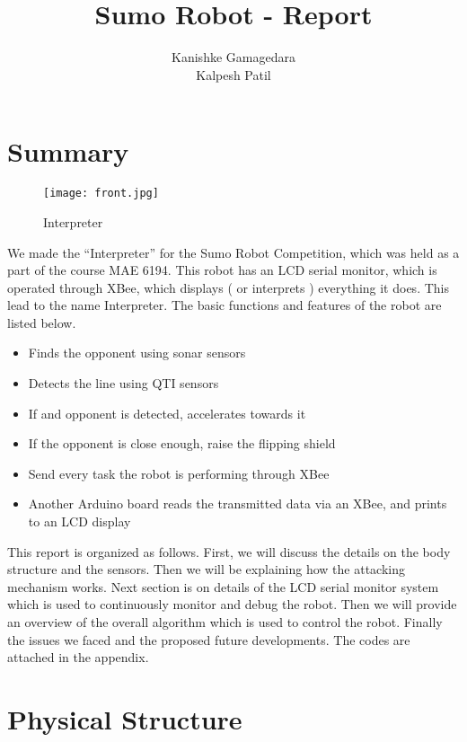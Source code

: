 \documentclass[11pt, letterpaper, oneside]{article}
\title{Sumo Robot - Report}
\author{Kanishke Gamagedara \\ Kalpesh Patil}
\begin{document}

\newpage



\tableofcontents


\newpage
\section{Summary}

\begin{figure}[bth]
	\begin{center}
		\texttt{[image: front.jpg]}
		\caption{Interpreter}
		\label{fig:front}
	\end{center}
\end{figure}

We made the ``Interpreter'' for the Sumo Robot Competition, which was held as a part of the course MAE 6194. This robot has an LCD serial monitor, which is operated through XBee, which displays ( or interprets ) everything it does. This lead to the name Interpreter.  The basic functions and features of the robot are listed below.
\begin{itemize}
	\item Finds the opponent using sonar sensors
	\item Detects the line using QTI sensors
	\item If and opponent is detected, accelerates towards it
	\item If the opponent is close enough, raise the flipping shield
	\item Send every task the robot is performing through XBee
	\item Another Arduino board reads the transmitted data via an XBee, and prints to an LCD display
\end{itemize}

This report is organized as follows. First, we will discuss the details on the body structure and the sensors. Then we will be explaining how the attacking mechanism works. Next section is on details of the LCD serial monitor system which is used to continuously monitor and debug the robot. Then we will provide an overview of the overall algorithm which is used to control the robot. Finally the issues we faced and the proposed future developments. The codes are attached in the appendix.


\newpage
\section{Physical Structure}
\end{document}
